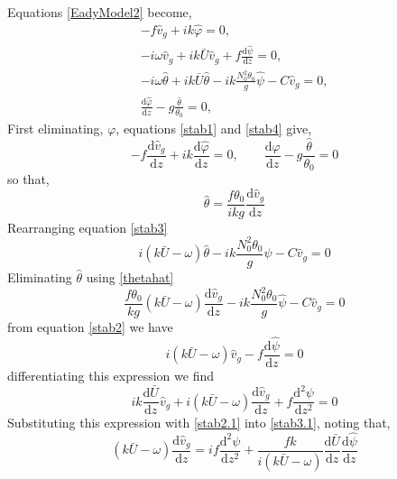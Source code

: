 Equations \ref{EadyModel2} become,
\begin{align}
-f\hat{v}_g + ik\hat{\varphi} = 0,\label{stab1}\\
-i\omega \hat{v}_g + ik\bar{U}\hat{v}_g + f\frac{\text{d}\hat{\psi}}{\text{d}z} = 0,\label{stab2}\\
-i \omega \hat{\theta} + i k \bar{U} \hat{\theta} - ik\frac{N_0^2\theta_0}{g} \hat{\psi} - C\hat{v}_g = 0,\label{stab3}\\
\frac{\text{d}\hat{\varphi}}{\text{d}z} - g\frac{\hat{\theta}}{\theta_0} = 0 \label{stab4},
\end{align}
First eliminating, $\varphi$, equations \ref{stab1} and \ref{stab4} give,
\begin{equation*}
-f\frac{\text{d}\hat{v}_g}{\text{d}z}+ik\frac{\text{d}\hat{\varphi}}{\text{d}z} = 0, \qquad \frac{\text{d}\hat{\varphi}}{\text{d}z} - g\frac{\hat{\theta}}{\theta_0} = 0
\end{equation*}
so that,
\begin{equation}
\hat{\theta} = \frac{f\theta_0}{ikg} \frac{\text{d}\hat{v}_g}{\text{d}z}
\label{thetahat}
\end{equation}
Rearranging equation \ref{stab3}
\begin{equation}
i\left( k \bar{U} - \omega \right) \hat{\theta} - ik\frac{N_0^2\theta_0}{g} \hat{\psi} - C\hat{v}_g = 0
\label{stab3.1}
\end{equation}
Eliminating $\hat{\theta}$ using \ref{thetahat}
\begin{equation*}
\frac{f\theta_0}{kg}\left( k \bar{U} - \omega \right)  \frac{\text{d}\hat{v}_g}{\text{d}z} - ik\frac{N_0^2\theta_0}{g} \hat{\psi} - C\hat{v}_g = 0
\end{equation*}
from equation \ref{stab2} we have
\begin{equation}
i\left( k \bar{U} - \omega \right) \hat{v}_g - f \frac{\text{d}\hat{\psi}}{\text{d}z} = 0
\label{stab2.1}
\end{equation}
differentiating this expression we find
\begin{equation*}
ik \frac{\text{d}\bar{U}}{\text{d}z} \hat{v}_g + i(k\bar{U}-\omega)\frac{\text{d}\hat{v}_g}{\text{d}z} + f\frac{\text{d}^2{\psi}}{\text{d}z^2} = 0 
\end{equation*}
Substituting this expression with \ref{stab2.1} into \ref{stab3.1}, noting that,
\begin{equation*}
(k\bar{U}-\omega)\frac{\text{d}\hat{v}_g}{\text{d}z} = if\frac{\text{d}^2{\psi}}{\text{d}z^2} + \frac{fk}{i(k\bar{U}-\omega)}\frac{\text{d}\bar{U}}{\text{d}z}\frac{\text{d}\hat{\psi}}{\text{d}z}
\end{equation*}
